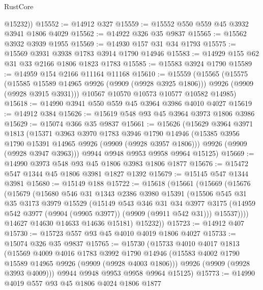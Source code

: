 \begin{lexlean}{RustCore}
\begin{coremodule}
        @15232))
@15552 := @14912 @327
@15559 := @15552 @550 @559 @45 @3932 @3941 @1806 @4029
@15562 := @14922 @326 @35 @9837
@15565 := @15562 @3932 @3939 @1955
@15569 := @14930 @157 @31 @34 @1793
@15575 := @15569 @3931 @3938 @1783 @3914 @1790 @14946
@15583 := @14929 @155 @62 @31 @33 @2166 @1806 @1823 @1783
@15585 := @15583 @3924 @1790
@15589 := @14959 @154 @2166 @11164 @11168
@15610 := @15559
    (@15565
      (@15575
        (@15585 @15589 @14965 @9926 (@9909 (@9928 @3925 @1806)))
        @9926
        (@9909 (@9928 @3915 @3931)))
      @10567
      @10570
      @10573
      @10577
      @10582
      @14985)
@15618 := @14990 @3941 @550 @559 @45 @3964 @3986 @4010 @4027
@15619 := @14912 @384
@15626 := @15619 @548 @93 @45 @3964 @3973 @1806 @3986
@15629 := @15074 @366 @35 @9837
@15661 := @15626
    (@15629
      @3964
      @3971
      @1813
      (@15371
        @3963
        @3970
        @1783
        @3946
        @1790
        @14946
        (@15385 @3956 @1790 @15391 @14965 @9926 (@9909 (@9928 @3957 @1806)))
        @9926
        (@9909 (@9928 @3947 @3963)))
      @9944
      @9948
      @9953
      @9958
      @9964
      @15125)
@15669 := @14990 @3973 @548 @93 @45 @1806 @3983 @1806 @1877
@15676 := @15472 @547 @1344 @45 @1806 @3981 @1827 @1392
@15679 := @15145 @547 @1344 @3981
@15680 := @15149 @188
@15722 := @15618
    (@15661
      (@15669
        (@15676
          (@15679
            (@15680
              @546
              @31
              @1343
              @2386
              @3980
              @15391
              (@15506
                @545
                @31
                @35
                @3173
                @3979
                @15529
                (@15149
                  @543
                  @346
                  @31
                  @34
                  @3977
                  @3175
                  (@14959 @542 @3977 (@9904 (@9905 @3977)) (@9909 (@9911 @542 @31)))
                  @15537))))
          @14627
          @14630
          @14633
          @14636
          @15181)
        @15232))
@15723 := @14912 @407
@15730 := @15723 @557 @93 @45 @4010 @4019 @1806 @4027
@15733 := @15074 @326 @35 @9837
@15765 := @15730
    (@15733
      @4010
      @4017
      @1813
      (@15569
        @4009
        @4016
        @1783
        @3992
        @1790
        @14946
        (@15583 @4002 @1790 @15589 @14965 @9926 (@9909 (@9928 @4003 @1806)))
        @9926
        (@9909 (@9928 @3993 @4009)))
      @9944
      @9948
      @9953
      @9958
      @9964
      @15125)
@15773 := @14990 @4019 @557 @93 @45 @1806 @4024 @1806 @1877

\end{coremodule}
\end{lexlean}
